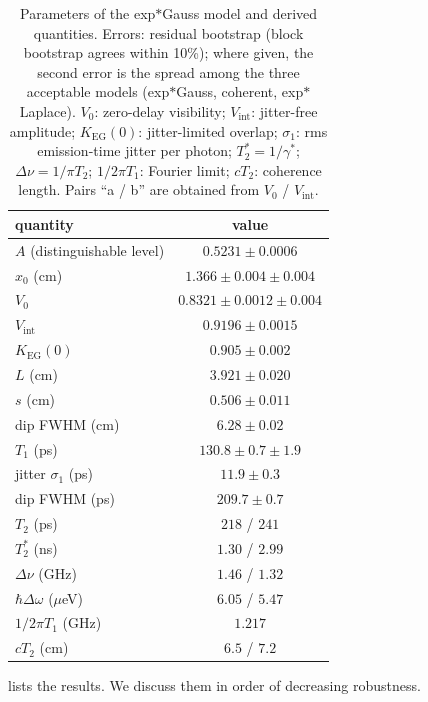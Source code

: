 \documentclass{article}
\newcommand{\Kg}{K_{\mathrm{EG}}}
\newcommand{\Vi}{V_{\mathrm{int}}}
\begin{document}
\begin{table}[t]
  \caption{Parameters of the exp$\ast$Gauss model and derived quantities.
  Errors: residual bootstrap (block bootstrap agrees within 10\%); where
  given, the second error is the spread among the three acceptable models
  (exp$\ast$Gauss, coherent, exp$\ast$Laplace). $V_0$: zero-delay visibility;
  $\Vi$: jitter-free amplitude; $\Kg(0)$: jitter-limited overlap;
  $\sigma_1$: rms emission-time jitter per photon; $T_2^*=1/\gamma^*$;
  $\Delta\nu=1/\pi T_2$; $1/2\pi T_1$: Fourier limit; $cT_2$: coherence
  length. Pairs ``a / b'' are obtained from $V_0$ / $\Vi$.}
  \label{tab:params}
  \vskip 0.05in
  \centering
  \footnotesize
  \setlength{\tabcolsep}{2pt}
  \begin{tabular}{lc}
    \toprule
    quantity & value \\
    \midrule
    $A$ (distinguishable level) & $0.5231\pm0.0006$ \\
    $x_0$ (cm) & $1.366\pm0.004\pm0.004$ \\
    $V_0$ & $0.8321\pm0.0012\pm0.004$ \\
    $\Vi$ & $0.9196\pm0.0015$ \\
    $\Kg(0)$ & $0.905\pm0.002$ \\
    $L$ (cm) & $3.921\pm0.020$ \\
    $s$ (cm) & $0.506\pm0.011$ \\
    dip FWHM (cm) & $6.28\pm0.02$ \\
    \midrule
    $T_1$ (ps) & $130.8\pm0.7\pm1.9$ \\
    jitter $\sigma_1$ (ps) & $11.9\pm0.3$ \\
    dip FWHM (ps) & $209.7\pm0.7$ \\
    $T_2$ (ps) & $218$ / $241$ \\
    $T_2^*$ (ns) & $1.30$ / $2.99$ \\
    $\Delta\nu$ (GHz) & $1.46$ / $1.32$ \\
    $\hbar\Delta\omega$ ($\mu$eV) & $6.05$ / $5.47$ \\
    $1/2\pi T_1$ (GHz) & $1.217$ \\
    $cT_2$ (cm) & $6.5$ / $7.2$ \\
    \bottomrule
  \end{tabular}
\end{table}

 lists the results. We discuss them in order of decreasing
robustness.
\end{document}
